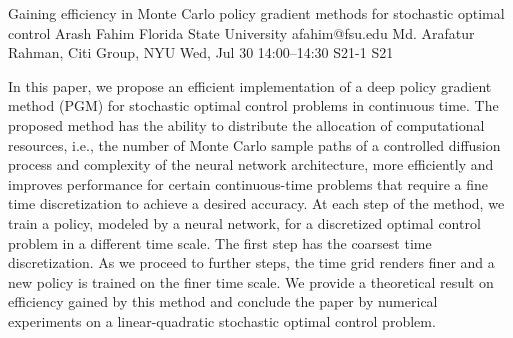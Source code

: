 \documentclass[12pt,lettersize,oneside]{book} %
\begin{document}
\begin{talk}
  {Gaining efficiency in Monte Carlo policy gradient methods for stochastic optimal control}%
  {Arash Fahim}%
  {Florida State University}%
  {afahim@fsu.edu}%
  {Md. Arafatur Rahman, Citi Group, NYU}%
  {}%
  {Wed, Jul 30 14:00--14:30}%
  {S21-1}%
  {S21}%
  
    
   
In this paper, we propose an efficient implementation of a deep policy gradient method (PGM) for stochastic optimal control problems in continuous time. The proposed method has the ability to distribute the allocation of computational resources, i.e., the number of Monte Carlo  sample paths of a controlled diffusion process and complexity of the neural network architecture, more efficiently and improves performance for certain continuous-time problems that require a fine time discretization to achieve a desired accuracy. At each step of the method, we train a policy, modeled by a neural network, for a discretized optimal control problem in a different time scale. The first step has the coarsest time discretization. As we proceed to further steps, the time grid renders finer and a new policy is trained on the finer time scale. We provide a theoretical result on efficiency gained by this method and conclude the paper by numerical experiments on a linear-quadratic stochastic optimal control problem.

\medskip


\end{talk}
\end{document}
